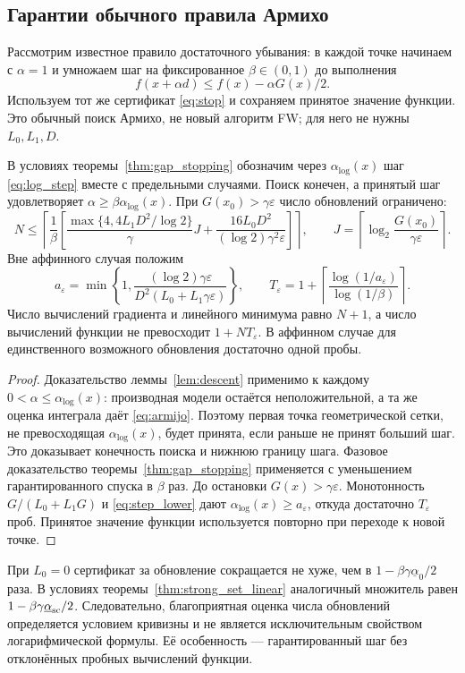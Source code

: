 \subsection{Гарантии обычного правила Армихо}\label{sec:armijo}
Рассмотрим известное правило достаточного убывания: в каждой точке
начинаем с $\alpha=1$ и умножаем шаг на фиксированное
$\beta\in(0,1)$ до выполнения
\begin{equation}\label{eq:armijo}
 f(x+\alpha d)\le f(x)-\alpha G(x)/2.
\end{equation}
Используем тот же сертификат \eqref{eq:stop} и сохраняем принятое
значение функции. Это обычный поиск Армихо, не новый алгоритм FW;
для него не нужны $L_0,L_1,D$.

\begin{proposition}
\label{prop:armijo}
В условиях теоремы~\ref{thm:gap_stopping} обозначим через
$\alpha_{\log}(x)$ шаг \eqref{eq:log_step} вместе с предельными случаями.
Поиск конечен, а принятый шаг удовлетворяет
$\alpha\ge\beta\alpha_{\log}(x)$.
При $G(x_0)>\gamma\varepsilon$ число обновлений ограничено:
\[
 N\le\left\lceil\frac1\beta\left[
 \frac{\max\{4,4L_1D^2/\log2\}}\gamma J
 +\frac{16L_0D^2}{(\log2)\gamma^2\varepsilon}
 \right]\right\rceil,
 \qquad J=\left\lceil\log_2\frac{G(x_0)}{\gamma\varepsilon}\right\rceil.
\]
Вне аффинного случая положим
\[
 a_\varepsilon=\min\left\{1,
 \frac{(\log2)\gamma\varepsilon}
 {D^2(L_0+L_1\gamma\varepsilon)}\right\},\qquad
 T_\varepsilon=1+\left\lceil\frac{\log(1/a_\varepsilon)}{\log(1/\beta)}\right\rceil.
\]
Число вычислений градиента и линейного минимума равно $N+1$,
а число вычислений функции не превосходит $1+NT_\varepsilon$.
В аффинном случае для единственного возможного обновления
достаточно одной пробы.
\end{proposition}
\begin{proof}
Доказательство леммы~\ref{lem:descent} применимо к каждому
$0<\alpha\le\alpha_{\log}(x)$: производная модели остаётся
неположительной, а та же оценка интеграла даёт \eqref{eq:armijo}.
Поэтому первая точка геометрической сетки, не превосходящая
$\alpha_{\log}(x)$, будет принята, если раньше не принят больший шаг.
Это доказывает конечность поиска и нижнюю границу шага.
Фазовое доказательство теоремы~\ref{thm:gap_stopping} применяется
с уменьшением гарантированного спуска в $\beta$ раз.
До остановки $G(x)>\gamma\varepsilon$. Монотонность
$G/(L_0+L_1G)$ и \eqref{eq:step_lower} дают
$\alpha_{\log}(x)\ge a_\varepsilon$, откуда достаточно
$T_\varepsilon$ проб. Принятое значение функции используется
повторно при переходе к новой точке.
\end{proof}
При $L_0=0$ сертификат за обновление сокращается не хуже, чем
в $1-\beta\gamma\underline\alpha_0/2$ раза. В условиях
теоремы~\ref{thm:strong_set_linear} аналогичный множитель равен
$1-\beta\gamma\underline\alpha_{\rm sc}/2$.
Следовательно, благоприятная оценка числа обновлений определяется
условием кривизны и не является исключительным свойством
логарифмической формулы. Её особенность --- гарантированный шаг
без отклонённых пробных вычислений функции.
